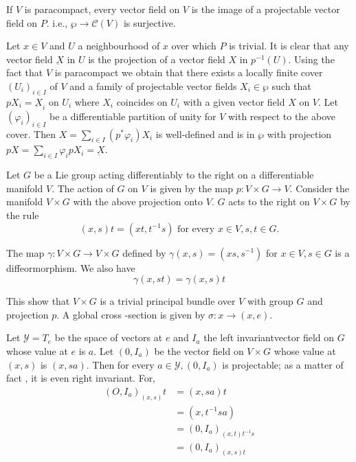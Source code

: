 \begin{proposition}\label{chap2:sec9:prop7} %
  If $V$ is paracompact, every vector field on $V$ is the image of a
  projectable  vector field on $P.$ i.e., $\wp \to \mathscr{C}(V) $ is
  surjective.\pageoriginale  

  Let $x \in V$ and $U$ a neighbourhood of $x$ over which $P$ is
  trivial. It is clear that any vector field $\underbar{X}$ in $U$ is
  the projection of a vector field $X$ in $p^{-1}(U)$. Using the fact
  that $V$ is paracompact we obtain that there exists a locally finite
  cover $(U_i)_{ i \in I}$ of $V$ and a family of projectable vector
  fields $X_i \in \wp$ such that $ p X_i  = \underbar{X}_i$ on $U_i$
  where $X_i$ coincides on $U_i$ with a given vector field $X$ on
  $V$. Let $(\varphi_i )_{ i \in I}$ be a differentiable partition of
  unity for $V$ with respect to the above cover. Then $X =
  \sum\limits_{ i \in I}(p^*\varphi_i)X_i$ is well-defined  and is in
  $\wp$ with projection $pX = \sum\limits_{i \in I}\varphi _ i p X_i =
  \underbar{X}$.  
\end{proposition}
 
\begin{example*}
  Let $G$ be a Lie group acting differentiably to the right on a
  differentiable manifold $V$. The action of $G$ on $V$ is given by
  the map $p: V \times G \to V$. Consider the manifold $V \times G$
  with the above projection onto $V$. $G$ acts to the right on $V
  \times G$ by the rule  
  $$
  (x, s )t = (xt, t ^{-1} s) \text{ for every } x \in V, s, t \in G. 
  $$
  
  The map $\gamma : V \times G \to V \times G$ defined by  $\gamma (x,
  s) = ( xs,  s^{-1})$ for $x \in V, s \in G$ is a diffeormorphism. We
  also have  
  $$
  \gamma (x , st) = \gamma ( x , s) t 
  $$

  This show that $V \times G$ is a trivial principal bundle over $V$
  with group $G$ and projection $p$. A global cross -section is given by
  $\sigma : x \to (x, e)$. 
\end{example*} 
 
 Let $\mathscr{Y} = T_e$ be the space of vectors at $e$ and $I_a$ the
 left invariant\pageoriginale vector field on $G$ whose value at $e$ is $a$. Let
 $(0, I_a)$ be the vector field on $V \times G$ whose value at $(x
 ,s)$ is $( x, sa)$. Then for every $a \in \mathscr{Y}, (0, I_a) $ is
 projectable; as a matter of fact , it is even right invariant. For, 
\begin{align*}
  (O, I_a)_{(x , s)}t & = (x, sa ) t \\
  & = (x , t^{-1} sa)\\
  & = (0, I_a) _{(x, t) t^{-1}s}\\
  &  = (0, I_a)_{ (x, s) t}
\end{align*} 
 
